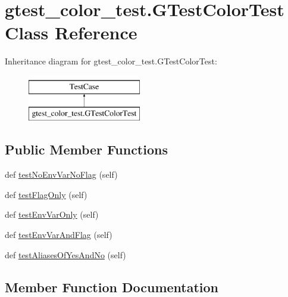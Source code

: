 \hypertarget{classgtest__color__test_1_1_g_test_color_test}{}\section{gtest\+\_\+color\+\_\+test.\+G\+Test\+Color\+Test Class Reference}
\label{classgtest__color__test_1_1_g_test_color_test}
Inheritance diagram for gtest\+\_\+color\+\_\+test.\+G\+Test\+Color\+Test\+:\begin{figure}[H]
\begin{center}
\leavevmode
\includegraphics[height=2.000000cm]{classgtest__color__test_1_1_g_test_color_test}
\end{center}
\end{figure}
\subsection*{Public Member Functions}
\begin{DoxyCompactItemize}
\item 
def \mbox{\hyperlink{classgtest__color__test_1_1_g_test_color_test_a22bf83ab416dc3ccd3c1b771ff74022c}{test\+No\+Env\+Var\+No\+Flag}} (self)
\item 
def \mbox{\hyperlink{classgtest__color__test_1_1_g_test_color_test_abc4c056b8e703e83516f9e5aea8dd25d}{test\+Flag\+Only}} (self)
\item 
def \mbox{\hyperlink{classgtest__color__test_1_1_g_test_color_test_aedb7bbaa0d6acff3628d91a471f4ceb5}{test\+Env\+Var\+Only}} (self)
\item 
def \mbox{\hyperlink{classgtest__color__test_1_1_g_test_color_test_ae88e8ec526135ed1448e83fc4ec7cd15}{test\+Env\+Var\+And\+Flag}} (self)
\item 
def \mbox{\hyperlink{classgtest__color__test_1_1_g_test_color_test_aaf2110e359494dc711e87d29d351dc47}{test\+Aliases\+Of\+Yes\+And\+No}} (self)
\end{DoxyCompactItemize}


\subsection{Member Function Documentation}
\mbox{\label{classgtest__color__test_1_1_g_test_color_test_aaf2110e359494dc711e87d29d351dc47}} 
